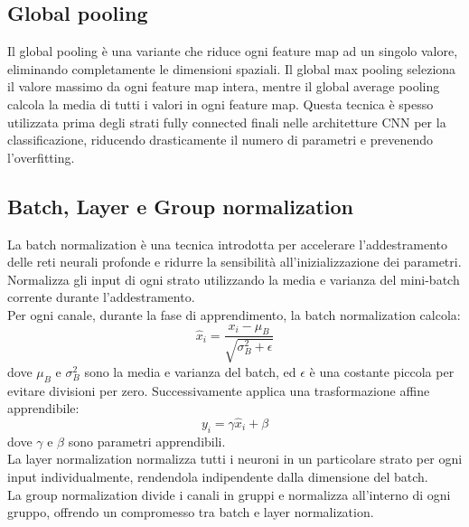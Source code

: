 \documentclass[a4paper,12pt]{report}
\begin{document}
	\subsection{Global pooling}
	
	Il global pooling è una variante che riduce ogni feature map ad un singolo valore, eliminando completamente le dimensioni spaziali. Il global max pooling seleziona il valore massimo da ogni feature map intera, mentre il global average pooling calcola la media di tutti i valori in ogni feature map. Questa tecnica è spesso utilizzata prima degli strati fully connected finali nelle architetture CNN per la classificazione, riducendo drasticamente il numero di parametri e prevenendo l'overfitting.
	
	\subsection{Batch, Layer e Group normalization}
	La batch normalization è una tecnica introdotta per accelerare l'addestramento delle reti neurali profonde e ridurre la sensibilità all'inizializzazione dei parametri. Normalizza gli input di ogni strato utilizzando la media e varianza del mini-batch corrente durante l'addestramento. \\
	Per ogni canale, durante la fase di apprendimento, la batch normalization calcola:
	$$\hat{x}_i = \frac{x_i - \mu_B}{\sqrt{\sigma_B^2 + \epsilon}}$$
	dove $\mu_B$ e $\sigma_B^2$ sono la media e varianza del batch, ed $\epsilon$ è una costante piccola per evitare divisioni per zero. Successivamente applica una trasformazione affine apprendibile:
	$$y_i = \gamma \hat{x}_i + \beta$$
	dove $\gamma$ e $\beta$ sono parametri apprendibili. \\
	La layer normalization normalizza tutti i neuroni in un particolare strato per ogni input individualmente, rendendola indipendente dalla dimensione del batch. \\
	La group normalization divide i canali in gruppi e normalizza all'interno di ogni gruppo, offrendo un compromesso tra batch e layer normalization.
	
\end{document}
